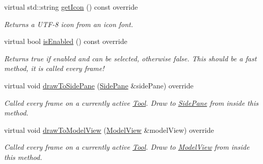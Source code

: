 \begin{DoxyCompactItemize}
virtual std\+::string \mbox{\hyperlink{classpepr3d_1_1_export_assistant_aa959ec6d01b6fdef8f3f094ef8e9eb95}{get\+Icon}} () const override
\begin{DoxyCompactList}\small\item\em Returns a U\+T\+F-\/8 icon from an icon font. \end{DoxyCompactList}\item 
\mbox{\label{classpepr3d_1_1_export_assistant_aa2d7a586b03190a3848a513bd1706613}} 
virtual bool \mbox{\hyperlink{classpepr3d_1_1_export_assistant_aa2d7a586b03190a3848a513bd1706613}{is\+Enabled}} () const override
\begin{DoxyCompactList}\small\item\em Returns true if enabled and can be selected, otherwise false. This should be a fast method, it is called every frame! \end{DoxyCompactList}\item 
\mbox{\label{classpepr3d_1_1_export_assistant_ac4f307d1aa139898232471b56e93efd3}} 
virtual void \mbox{\hyperlink{classpepr3d_1_1_export_assistant_ac4f307d1aa139898232471b56e93efd3}{draw\+To\+Side\+Pane}} (\mbox{\hyperlink{classpepr3d_1_1_side_pane}{Side\+Pane}} \&side\+Pane) override
\begin{DoxyCompactList}\small\item\em Called every frame on a currently active \mbox{\hyperlink{classpepr3d_1_1_tool}{Tool}}. Draw to \mbox{\hyperlink{classpepr3d_1_1_side_pane}{Side\+Pane}} from inside this method. \end{DoxyCompactList}\item 
\mbox{\label{classpepr3d_1_1_export_assistant_adc7fd57555d1f92afa856a892846b895}} 
virtual void \mbox{\hyperlink{classpepr3d_1_1_export_assistant_adc7fd57555d1f92afa856a892846b895}{draw\+To\+Model\+View}} (\mbox{\hyperlink{classpepr3d_1_1_model_view}{Model\+View}} \&model\+View) override
\begin{DoxyCompactList}\small\item\em Called every frame on a currently active \mbox{\hyperlink{classpepr3d_1_1_tool}{Tool}}. Draw to \mbox{\hyperlink{classpepr3d_1_1_model_view}{Model\+View}} from inside this method. \end{DoxyCompactList}\item 
\mbox{\label{classpepr3d_1_1_export_assistant_acb764e7f07b64884c024f079e3936037}} 

\end{DoxyCompactItemize}
